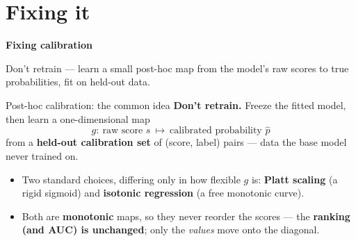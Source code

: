 \documentclass[aspectratio=169]{beamer}
\begin{document}
\section{Fixing it}

\begin{frame}[plain]
  \vfill
  \begin{center}
    {\Large\color{popblue}\textbf{Fixing calibration}}\\[0.9em]
    \begin{minipage}{0.82\textwidth}\centering\small
      Don't retrain --- learn a small post-hoc map from the model's raw scores to true
      probabilities, fit on held-out data.
    \end{minipage}
  \end{center}
  \vfill
\end{frame}

\begin{frame}{Post-hoc calibration: the common idea}
  \textbf{Don't retrain.} Freeze the fitted model, then learn a one-dimensional map
  \[ g:\ \text{raw score } s \ \longmapsto\ \text{calibrated probability } \hat p \]
  from a \textbf{held-out calibration set} of (score, label) pairs --- data the base model never
  trained on.
  \vfill
  \begin{itemize}\small
    \item Two standard choices, differing only in how flexible $g$ is: \textbf{Platt scaling}
      (a rigid sigmoid) and \textbf{isotonic regression} (a free monotonic curve).
    \item Both are \textbf{monotonic} maps, so they never reorder the scores --- the
      \textbf{ranking (and AUC) is unchanged}; only the \emph{values} move onto the diagonal.
  \end{itemize}
  \vfill
\end{frame}
\end{document}
